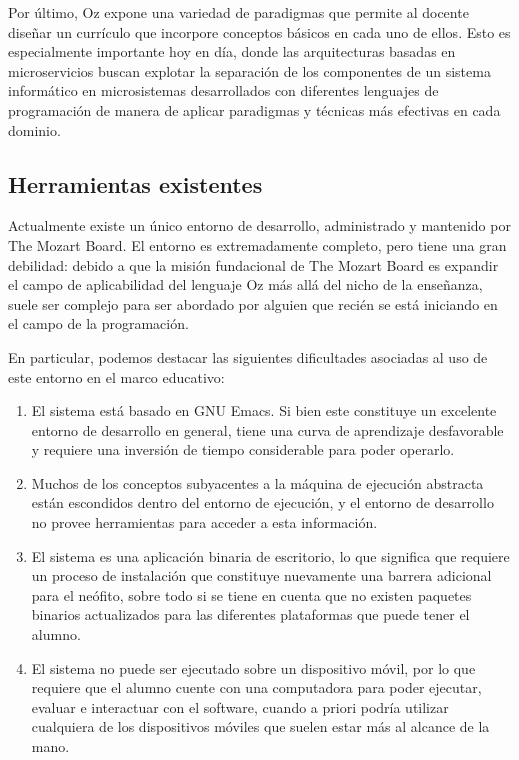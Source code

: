 \documentclass[a4paper,11pt]{article}
\begin{document}
Por último, Oz expone una variedad de paradigmas que permite al docente diseñar
un currículo que incorpore conceptos básicos en cada uno de ellos. Esto es
especialmente importante hoy en día, donde las arquitecturas basadas en
microservicios buscan explotar la separación de los componentes de un sistema
informático en microsistemas desarrollados con diferentes lenguajes de
programación de manera de aplicar paradigmas y técnicas más efectivas en cada
dominio.

\subsection{Herramientas existentes}

Actualmente existe un único entorno de desarrollo, administrado y mantenido por
The Mozart Board. El entorno es extremadamente completo, pero tiene una gran
debilidad: debido a que la misión fundacional de The Mozart Board es expandir
el campo de aplicabilidad del lenguaje Oz más allá del nicho de la enseñanza,
suele ser complejo para ser abordado por alguien que recién se está iniciando
en el campo de la programación.

En particular, podemos destacar las siguientes dificultades asociadas al uso de
este entorno en el marco educativo:

\begin{enumerate}

  \item El sistema está basado en GNU Emacs. Si bien este constituye un excelente
    entorno de desarrollo en general, tiene una curva de aprendizaje desfavorable y
    requiere una inversión de tiempo considerable para poder operarlo.

  \item Muchos de los conceptos subyacentes a la máquina de ejecución abstracta
    están escondidos dentro del entorno de ejecución, y el entorno de desarrollo
    no provee herramientas para acceder a esta información.

  \item El sistema es una aplicación binaria de escritorio, lo que significa que
    requiere un proceso de instalación que constituye nuevamente una barrera
    adicional para el neófito, sobre todo si se tiene en cuenta que no existen
    paquetes binarios actualizados para las diferentes plataformas que puede
    tener el alumno.

  \item El sistema no puede ser ejecutado sobre un dispositivo móvil, por lo que
    requiere que el alumno cuente con una computadora para poder ejecutar,
    evaluar e interactuar con el software, cuando a priori podría utilizar
    cualquiera de los dispositivos móviles que suelen estar más al alcance de la
    mano.

\end{enumerate}
\end{document}
